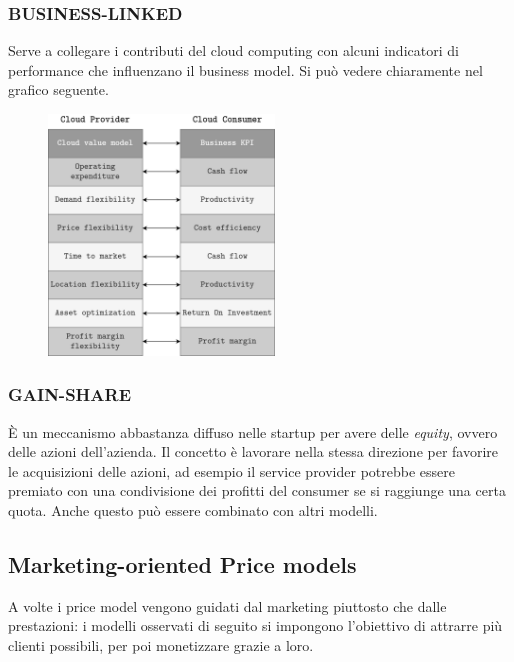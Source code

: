 \subsubsection{BUSINESS-LINKED}
Serve a collegare i contributi del cloud computing con alcuni indicatori di performance che influenzano il business model. Si può vedere chiaramente nel grafico seguente.

\begin{figure}[ht]
    \centering
    \includegraphics[width=6cm]{./Images/cap6/6.3.png}
\end{figure}

\subsubsection{GAIN-SHARE}
È un meccanismo abbastanza diffuso nelle startup per avere delle \textit{equity}, ovvero delle azioni dell'azienda. Il concetto è lavorare nella stessa direzione per favorire le acquisizioni delle azioni, ad esempio il service provider potrebbe essere premiato con una condivisione dei profitti del consumer se si raggiunge una certa quota. Anche questo può essere combinato con altri modelli.

\subsection{Marketing-oriented Price models}
A volte i price model vengono guidati dal marketing piuttosto che dalle prestazioni: i modelli osservati di seguito si impongono l'obiettivo di attrarre più clienti possibili, per poi monetizzare grazie a loro.

